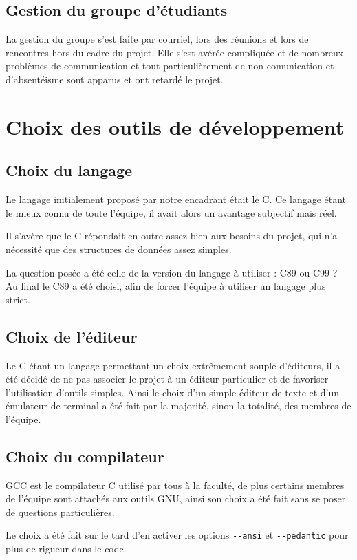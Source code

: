     \subsection{Gestion du groupe d’étudiants}
La gestion du groupe s'est faite par courriel, lors des réunions et lors de rencontres hors du cadre du projet.
Elle s'est avérée compliquée et de nombreux problèmes de communication et tout particulièrement de non comunication et d'absentéisme sont apparus et ont retardé le projet.

  \section{Choix des outils de développement}

    \subsection{Choix du langage}
Le langage initialement proposé par notre encadrant était le C. Ce langage étant le mieux connu de toute l'équipe, il avait alors un avantage subjectif mais réel.

Il s'avère que le C répondait en outre assez bien aux besoins du projet, qui n'a nécessité que des structures de données assez simples.

La question posée a été celle de la version du langage à utiliser : C89 ou C99 ?
Au final le C89 a été choisi, afin de forcer l'équipe à utiliser un langage plus strict.

    \subsection{Choix de l'éditeur}
Le C étant un langage permettant un choix extrêmement souple d'éditeurs, il a été décidé de ne pas associer le projet à un éditeur particulier et de favoriser l'utilisation d'outils simples.
Ainsi le choix d'un simple éditeur de texte et d'un émulateur de terminal a été fait par la majorité, sinon la totalité, des membres de l'équipe.

    \subsection{Choix du compilateur}
GCC est le compilateur C utilisé par tous à la faculté, de plus certains membres de l'équipe sont attachés aux outils GNU, ainsi son choix a été fait sans se poser de questions particulières.

Le choix a été fait sur le tard d'en activer les options \verb|--ansi| et \verb|--pedantic| pour plus de rigueur dans le code.

